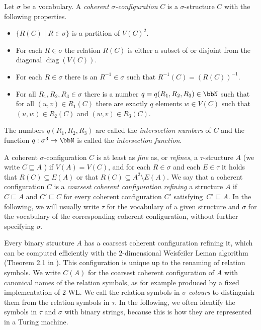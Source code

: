 \documentclass[a4paper,UKenglish,cleveref, autoref, thm-restate]{lipics-v2021}
\newcommand{\diag}{{\operatorname{diag}}}
\begin{document}
	\begin{definition}
		\label{def:PC_coherentConfig}
		Let $\sigma$ be a vocabulary.
		A \emph{coherent $\sigma$-configuration} $C$ is a $\sigma$-structure $C$
		with the following properties.
		\begin{itemize}
			\item $\{R(C) \mid R\in\sigma \}$ is a partition of $V(C)^2$.
			\item For each $R \in\sigma$ the relation $R(C)$ is either a
			subset of or disjoint from the diagonal $\diag(V(C))$.
			\item For each $R\in\sigma$ there is an
			$R^{-1}\in\sigma$ such that ${R^{-1}}(C)= (R(C))^{-1}$.
			\item For all $R_1,R_2,R_3\in\sigma$ there is a number
			$q = q(R_1, R_2 ,R_3)\in\bbN$ such that for all $(u,v)\in R_1(C)$ there are
			exactly $q$ elements $w \in V(C)$ such that $(u,w)\in R_2(C)$ and $(w,v)\in
			R_3(C)$.
		\end{itemize}
		The numbers $q(R_1,R_2,R_3)$ are called the \emph{intersection numbers} of
		$C$ and the function $q:\sigma^3\to \bbN$ is called the
		\emph{intersection function}.\\
	\end{definition}
	\vspace{-0.2cm}
	A coherent $\sigma$-configuration $C$ is at least as
	\emph{fine} as, or \emph{refines}, a
	$\tau$-structure $A$ (we write $C \sqsubseteq A$ ) if $V(A) = V(C)$, and for each $R\in\sigma$
	and each $E\in\tau$
	it holds that $R(C) \subseteq E(A)$ or that
	$R(C)\subseteq A^2\setminus E(A)$.
	We say that a coherent configuration $C$ is a \emph{coarsest coherent configuration refining} a
	structure $A$ if $C \sqsubseteq A$ and $C'\sqsubseteq C$ for every coherent
	configuration $C'$ satisfying~$C'\sqsubseteq A$. In the following, we will usually write $\tau$ for the vocabulary of a given structure and $\sigma$ for the vocabulary of the corresponding coherent configuration, without further specifying $\sigma$.

	Every binary structure $A$ has a coarsest coherent configuration refining it, which can be computed efficiently with the $2$-dimensional Weisfeiler Leman algorithm (Theorem 2.1 in \cite{dwl}). This configuration is unique up to the renaming of relation symbols. We write $C(A)$ for the coarsest coherent configuration of $A$ with canonical names of the relation symbols, as for example produced by a fixed implementation of $2$-WL. 
	We call the relation symbols in $\sigma$ \emph{colours} to distinguish them from the relation symbols in $\tau$. In the following, we often identify the symbols in $\tau$ and $\sigma$ with binary strings, because this is how they are represented in a Turing machine.
\end{document}
